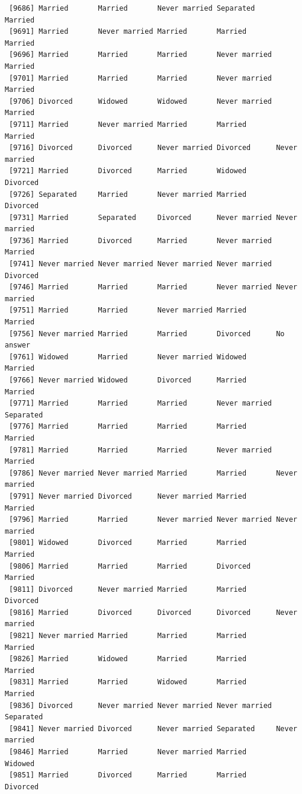 \documentclass[
  letterpaper,
  DIV=11,
  numbers=noendperiod,
  oneside]{scrartcl}
\begin{document}
\begin{verbatim}
 [9686] Married       Married       Never married Separated     Married      
 [9691] Married       Never married Married       Married       Married      
 [9696] Married       Married       Married       Never married Married      
 [9701] Married       Married       Married       Never married Married      
 [9706] Divorced      Widowed       Widowed       Never married Married      
 [9711] Married       Never married Married       Married       Married      
 [9716] Divorced      Divorced      Never married Divorced      Never married
 [9721] Married       Divorced      Married       Widowed       Divorced     
 [9726] Separated     Married       Never married Married       Divorced     
 [9731] Married       Separated     Divorced      Never married Never married
 [9736] Married       Divorced      Married       Never married Married      
 [9741] Never married Never married Never married Never married Divorced     
 [9746] Married       Married       Married       Never married Never married
 [9751] Married       Married       Never married Married       Married      
 [9756] Never married Married       Married       Divorced      No answer    
 [9761] Widowed       Married       Never married Widowed       Married      
 [9766] Never married Widowed       Divorced      Married       Married      
 [9771] Married       Married       Married       Never married Separated    
 [9776] Married       Married       Married       Married       Married      
 [9781] Married       Married       Married       Never married Married      
 [9786] Never married Never married Married       Married       Never married
 [9791] Never married Divorced      Never married Married       Married      
 [9796] Married       Married       Never married Never married Never married
 [9801] Widowed       Divorced      Married       Married       Married      
 [9806] Married       Married       Married       Divorced      Married      
 [9811] Divorced      Never married Married       Married       Divorced     
 [9816] Married       Divorced      Divorced      Divorced      Never married
 [9821] Never married Married       Married       Married       Married      
 [9826] Married       Widowed       Married       Married       Married      
 [9831] Married       Married       Widowed       Married       Married      
 [9836] Divorced      Never married Never married Never married Separated    
 [9841] Never married Divorced      Never married Separated     Never married
 [9846] Married       Married       Never married Married       Widowed      
 [9851] Married       Divorced      Married       Married       Divorced     

\end{verbatim}
\end{document}
